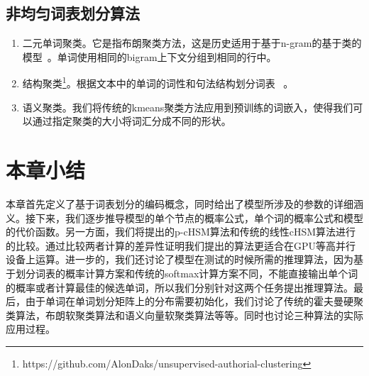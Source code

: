 \subsection{非均匀词表划分算法}
\begin{enumerate}
  \item 二元单词聚类。它是指布朗聚类方法，这是历史适用于基于n-gram的基于类的模型~。单词使用相同的bigram上下文分组到相同的行中。

  \item 结构聚类\footnote{https://github.com/AlonDaks/unsupervised-authorial-clustering}。根据文本中的单词的词性和句法结构划分词表~ 。

  \item 语义聚类。我们将传统的kmeans聚类方法应用到预训练的词嵌入，使得我们可以通过指定聚类的大小将词汇分成不同的形状。
\end{enumerate}

\section{本章小结}
本章首先定义了基于词表划分的编码概念，同时给出了模型所涉及的参数的详细涵义。接下来，我们逐步推导模型的单个节点的概率公式，单个词的概率公式和模型的代价函数。另一方面，我们将提出的p-cHSM算法和传统的线性cHSM算法进行的比较。通过比较两者计算的差异性证明我们提出的算法更适合在GPU等高并行设备上运算。进一步的，我们还讨论了模型在测试的时候所需的推理算法，因为基于划分词表的概率计算方案和传统的softmax计算方案不同，不能直接输出单个词的概率或者计算最佳的候选单词，所以我们分别针对这两个任务提出推理算法。最后，由于单词在单词划分矩阵上的分布需要初始化，我们讨论了传统的霍夫曼硬聚类算法，布朗软聚类算法和语义向量软聚类算法等等。同时也讨论三种算法的实际应用过程。